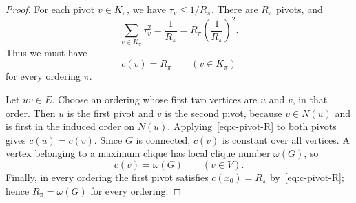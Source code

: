 \documentclass[10pt,a4paper]{amsart}
\begin{document}
\begin{proof}
		For each pivot $v\in K_\pi$, we have $\tau_v\leq1/R_\pi$.  There are
		$R_\pi$ pivots, and
		\[
		\sum_{v\in K_\pi}\tau_v^2
		=\frac1{R_\pi}
		=R_\pi\left(\frac1{R_\pi}\right)^2.
		\]
		Thus we must have
		\begin{equation}\label{eq:c-pivot-R}
			c(v)=R_\pi
			\qquad
			(v\in K_\pi)
		\end{equation}
		for every ordering $\pi$.
		
		Let $uv\in E$.  Choose an ordering whose first two vertices are $u$
		and $v$, in that order.  Then $u$ is the first pivot and $v$ is the
		second pivot, because $v\in N(u)$ and is first in the induced order on
		$N(u)$.  Applying~\eqref{eq:c-pivot-R} to both pivots gives
		$c(u)=c(v)$.  Since $G$ is connected, $c(v)$ is constant over all
		vertices.  A vertex belonging to a maximum clique has local clique number
		$\omega(G)$, so
		\[
		c(v)=\omega(G)
		\qquad(v\in V).
		\]
		Finally, in every ordering the first pivot satisfies
		$c(x_0)=R_\pi$ by~\eqref{eq:c-pivot-R}; hence
		$R_\pi=\omega(G)$ for every ordering.
	\end{proof}
\end{document}
